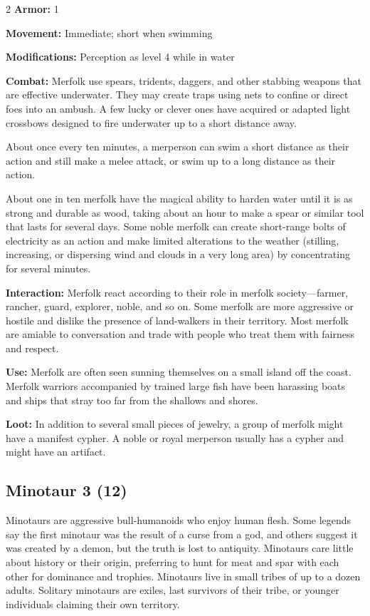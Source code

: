 \begin{multicols}{2}
\textbf{Armor:} 1 

\textbf{Movement:} Immediate; short when swimming 

\textbf{Modifications:} Perception as level 4 while in water 

\textbf{Combat:} Merfolk use spears, tridents, daggers, and other stabbing weapons that are effective underwater. They may create traps using nets to confine or direct foes into an ambush. A few lucky or clever ones have acquired or adapted light crossbows designed to fire underwater up to a short distance away. 

About once every ten minutes, a merperson can swim a short distance as their action and still make a melee attack, or swim up to a long distance as their action. 

About one in ten merfolk have the magical ability to harden water until it is as strong and durable as wood, taking about an hour to make a spear or similar tool that lasts for several days. Some noble merfolk can create short-range bolts of electricity as an action and make limited alterations to the weather (stilling, increasing, or dispersing wind and clouds in a very long area) by concentrating for several minutes. 

\textbf{Interaction:} Merfolk react according to their role in merfolk society—farmer, rancher, guard, explorer, noble, and so on. Some merfolk are more aggressive or hostile and dislike the presence of land-walkers in their territory. Most merfolk are amiable to conversation and trade with people who treat them with fairness and respect. 

\textbf{Use:} Merfolk are often seen sunning themselves on a small island off the coast. Merfolk warriors accompanied by trained large fish have been harassing boats and ships that stray too far from the shallows and shores. 

\textbf{Loot:} In addition to several small pieces of jewelry, a group of merfolk might have a manifest cypher. A noble or royal merperson usually has a cypher and might have an artifact.

\subsection{Minotaur 3 (12)}

Minotaurs are aggressive bull-humanoids who enjoy human flesh. Some legends say the first minotaur was the result of a curse from a god, and others suggest it was created by a demon, but the truth is lost to antiquity. Minotaurs care little about history or their origin, preferring to hunt for meat and spar with each other for dominance and trophies. Minotaurs live in small tribes of up to a dozen adults. Solitary minotaurs are exiles, last survivors of their tribe, or younger individuals claiming their own territory. 


\end{multicols}
